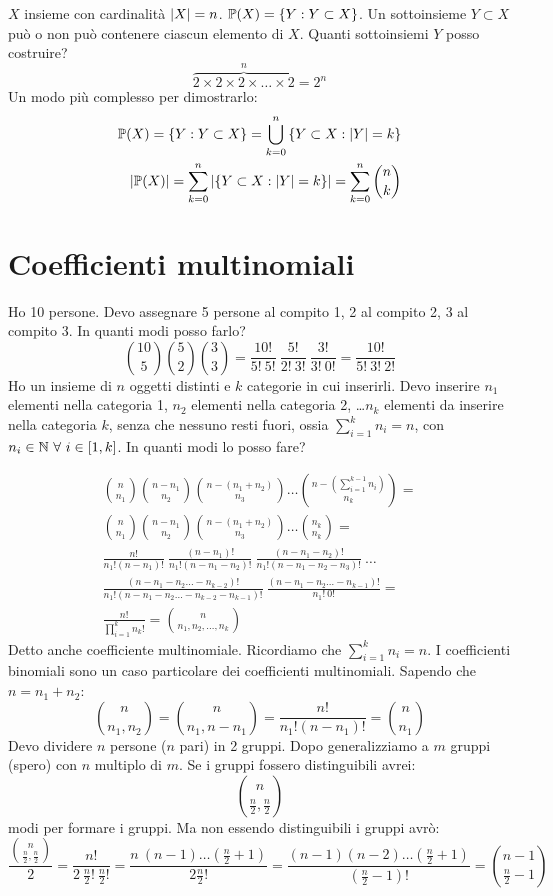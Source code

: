 $X$ insieme con cardinalit\`a $\left\lvert{X}\right\rvert = n$. $\mathbb{P}(X) = \left \{ Y : Y \subset X \right\}$. Un sottoinsieme $Y \subset X$ pu\`o o non pu\`o contenere ciascun elemento di $X$. Quanti sottoinsiemi $Y$ posso costruire?
\[
\overbrace{2 \times 2 \times 2 \times \dots \times 2}^{n} = 2^n
\]
Un modo pi\`u complesso per dimostrarlo:
\begin{align*}
\mathbb{P}(X) = \left \{Y :  Y \subset X \right\} = \bigcup_{k=0}^{n} \left \{ Y \subset X : \left\lvert{Y}\right\rvert = k \right\} \\
\left\lvert{\mathbb{P}(X)}\right\rvert = \sum_{k=0}^{n} \left\lvert{\left\{ Y \subset X : \left\lvert{Y}\right\rvert = k\right\}}\right\rvert  = \sum_{k = 0}^{n} \binom{n}{k}
\end{align*}

\section{Coefficienti multinomiali}

Ho 10 persone. Devo assegnare 5 persone al compito 1, 2 al compito 2, 3 al compito 3. In quanti modi posso farlo?
\[
\binom{10}{5} \binom{5}{2} \binom{3}{3} = 
\frac{10!}{5! \ 5!} \ \frac{5!}{2! \ 3!} \ \frac{3!}{3! \ 0!} =
\frac{10!}{5! \ 3! \ 2!}
\]
Ho un insieme di $n$ oggetti distinti e $k$ categorie in cui inserirli. Devo inserire $n_1$ elementi nella categoria 1, $n_2$ elementi nella categoria 2, \dots $n_k$ elementi da inserire nella categoria $k$, senza che nessuno resti fuori, ossia $\sum_{i = 1}^{k} n_i = n$, con $n_i \in \naturals \forall i \in [1, k]$. In quanti modi lo posso fare?

\begin{align*}
\binom{n}{n_1} \binom{n - n_1}{n_2} \binom{n - (n_1 + n_2)}{n_3}\dots \binom{n - \left( \sum_{i = 1}^{k-1} n_i \right)}{n_k} = \\
\binom{n}{n_1} \binom{n - n_1}{n_2} \binom{n - (n_1 + n_2)}{n_3}\dots \binom{n_k}{n_k} = \\
\frac{n!}{n_1! \left( n - n_1\right)!} \ 
\frac{(n - n_1)!}{n_1! \left( n - n_1 - n_2\right)!} \ 
\frac{(n - n_1 - n_2)!}{n_1! \left( n - n_1 - n_2 - n_3\right)!} \ 
\dots \\
\frac{(n - n_1 - n_2 \dots - n_{k-2})!}{n_1! \left( n - n_1 - n_2 \dots - n_{k-2} - n_{k-1} \right)!} \ 
\frac{(n - n_1 - n_2 \dots - n_{k-1})!}{n_1! \ 0!} = \\
\frac{n!}{\prod_{i=1}^{k}n_k!} =
\binom{n}{n_1, n_2, \dots, n_k}
\end{align*}
Detto anche coefficiente multinomiale. Ricordiamo che $\sum_{i = 1}^{k} n_i = n$. I coefficienti binomiali sono un caso particolare dei coefficienti multinomiali. Sapendo che $n = n_1 + n_2$:
\[
\binom{n}{n_1, n_2} = \binom{n}{n_1, n - n_1} = \frac{n!}{n_1! (n - n_1)!} = \binom{n}{n_1}
\]
Devo dividere $n$ persone ($n$ pari) in 2 gruppi. Dopo generalizziamo a $m$ gruppi (spero) con $n$ multiplo di $m$. Se i gruppi fossero distinguibili avrei:
\[
\binom{n}{\frac{n}{2}, \frac{n}{2}}
\] 
modi per formare i gruppi. Ma non essendo distinguibili i gruppi avr\`o:
\[
\frac{\binom{n}{\frac{n}{2}, \frac{n}{2}}}{2} = \frac{n!}{2 \ \frac{n}{2}! \ \frac{n}{2}!} = \frac{n \ (n - 1) \dots (\frac{n}{2}+1)}{2 \frac{n}{2}!} = \frac{(n-1)(n-2) \dots (\frac{n}{2} + 1)}{(\frac{n}{2}-1)!} = \binom{n-1}{\frac{n}{2}-1}
\] 
